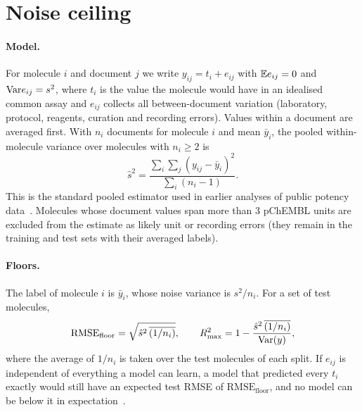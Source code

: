 \section{Noise ceiling}\label{sec:ceiling}
\paragraph{Model.}
For molecule $i$ and document $j$ we write $y_{ij}=t_i+e_{ij}$ with $\mathbb{E} e_{ij}=0$ and $\mathrm{Var} e_{ij}=s^2$, where $t_i$ is the value the molecule would have in an idealised common assay and $e_{ij}$ collects all between-document variation (laboratory, protocol, reagents, curation and recording errors). Values within a document are averaged first. With $n_i$ documents for molecule $i$ and mean $\bar y_i$, the pooled within-molecule variance over molecules with $n_i\ge 2$ is
\begin{equation}
\hat s^2=\frac{\sum_i\sum_{j}(y_{ij}-\bar y_i)^2}{\sum_i (n_i-1)} .
\end{equation}
This is the standard pooled estimator used in earlier analyses of public potency data~\cite{kramer2012experimental,kalliokoski2013comparability}. Molecules whose document values span more than 3 pChEMBL units are excluded from the estimate as likely unit or recording errors (they remain in the training and test sets with their averaged labels).

\paragraph{Floors.}
The label of molecule $i$ is $\bar y_i$, whose noise variance is $s^2/n_i$. For a set of test molecules,
\begin{equation}
\mathrm{RMSE}_{\mathrm{floor}}=\sqrt{\hat s^2\,\overline{(1/n_i)}},\qquad
R^2_{\max}=1-\frac{\hat s^2\,\overline{(1/n_i)}}{\mathrm{Var}(y)},
\end{equation}
where the average of $1/n_i$ is taken over the test molecules of each split. If $e_{ij}$ is independent of everything a model can learn, a model that predicted every $t_i$ exactly would still have an expected test RMSE of $\mathrm{RMSE}_{\mathrm{floor}}$, and no model can be below it in expectation~\cite{kolmar2021noise}.

